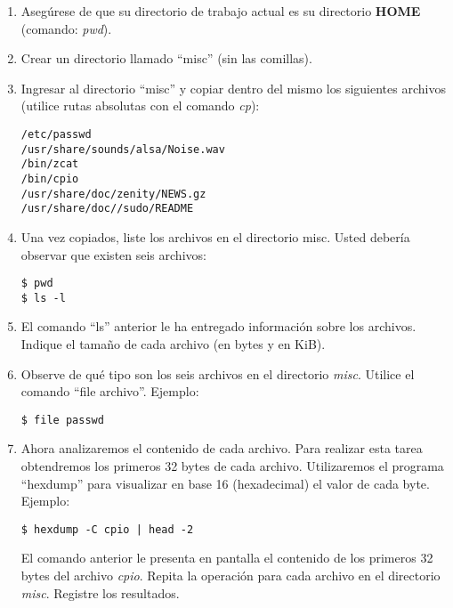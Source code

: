 \documentclass[12pt]{article}
\begin{document}
\begin{enumerate}

    \item Asegúrese de que su directorio de trabajo actual es su directorio
        \textbf{HOME} (comando: \emph{pwd}).

    \item Crear un directorio llamado ``misc'' (sin las comillas).

    \item Ingresar al directorio ``misc'' y copiar dentro del mismo los
        siguientes archivos (utilice rutas absolutas con el comando \emph{cp}):

\begin{verbatim}
/etc/passwd
/usr/share/sounds/alsa/Noise.wav
/bin/zcat
/bin/cpio
/usr/share/doc/zenity/NEWS.gz
/usr/share/doc//sudo/README
\end{verbatim}

    \item Una vez copiados, liste los archivos en el directorio misc. Usted
        debería observar que existen seis archivos:

        \begin{verbatim}
$ pwd 
$ ls -l
        \end{verbatim}

    \item El comando ``ls'' anterior le ha entregado información sobre los
        archivos.  Indique el tamaño de cada archivo (en bytes y en KiB).

    \item Observe de qué tipo son los seis archivos en el directorio
        \emph{misc}.  Utilice el comando ``file archivo''. Ejemplo:

        \begin{verbatim}
$ file passwd
        \end{verbatim}

    \item Ahora analizaremos el contenido de cada archivo. Para realizar esta
        tarea obtendremos los primeros 32 bytes de cada archivo. Utilizaremos
        el programa ``hexdump'' para visualizar en base 16 (hexadecimal) el
        valor de cada byte. Ejemplo:

        \begin{verbatim}
$ hexdump -C cpio | head -2
        \end{verbatim}

        El comando anterior le presenta en pantalla el contenido de los
        primeros 32 bytes del archivo \emph{cpio}. Repita la operación para
        cada archivo en el directorio \emph{misc}. Registre los resultados.


\end{enumerate}
\end{document}
